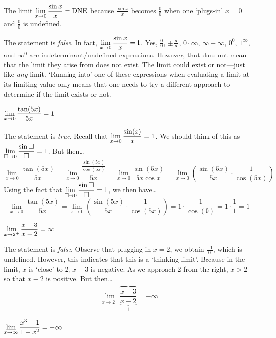 \documentclass[11pt,letterpaper]{article}
\begin{document}
 The limit $\displaystyle\lim_{x \to 0} \dfrac{\sin x}{x}= \text{DNE}$ because $\tfrac{\sin x}{x}$ becomes $\tfrac{0}{0}$ when one `plugs-in' $x= 0$ and $\frac{0}{0}$ is undefined. \pspace

\sol The statement is \textit{false}. In fact, $\displaystyle\lim_{x \to 0} \dfrac{\sin x}{x}= 1$. Yes, $\tfrac{0}{0}$, $\pm\tfrac{\infty}{\infty}$, $0 \cdot \infty$, $\infty - \infty$, $0^0$, $1^\infty$, and $\infty^0$ are indeterminant/undefined expressions. However, that does not mean that the limit they arise from does not exist. The limit could exist or not---just like \textit{any} limit. `Running into' one of these expressions when evaluating a limit at its limiting value only means that one needs to try a different approach to determine if the limit exists or not. \pvspace{1.3cm}



 $\displaystyle\lim_{x \to 0} \dfrac{\tan(5x)}{5x}= 1$ \pspace

\sol The statement is \textit{true}. Recall that $\displaystyle\lim_{x \to 0} \dfrac{\sin(x)}{x}= 1$. We should think of this as $\displaystyle\lim_{\Box \to 0} \dfrac{\sin \Box}{\Box}= 1$. But then\dots
	\[
	\lim_{x \to 0} \dfrac{\tan(5x)}{5x}= \lim_{x \to 0} \dfrac{\tfrac{\sin(5x)}{\cos(5x)}}{5x}= \lim_{x \to 0} \dfrac{\sin(5x)}{5x \cos x}= \lim_{x \to 0} \left( \dfrac{\sin(5x)}{5x} \cdot \dfrac{1}{\cos(5x)} \right)
	\]
Using the fact that $\displaystyle\lim_{\Box \to 0} \dfrac{\sin \Box}{\Box}= 1$, we then have\dots
	\[
	\lim_{x \to 0} \dfrac{\tan(5x)}{5x}= \lim_{x \to 0} \left( \dfrac{\sin(5x)}{5x} \cdot \dfrac{1}{\cos(5x)} \right)= 1 \cdot \dfrac{1}{\cos(0)}= 1 \cdot \dfrac{1}{1}= 1
	\] \pvspace{1.3cm}



 $\displaystyle\lim_{x \to 2^+} \dfrac{x - 3}{x - 2}= \infty$ \pspace

\sol The statement is \textit{false}. Observe that plugging-in $x= 2$, we obtain $\frac{-1}{0}$, which is undefined. However, this indicates that this is a `thinking limit'. Because in the limit, $x$ is `close' to 2, $x - 3$ is negative. As we approach 2 from the right, $x > 2$ so that $x - 2$ is positive. But then\dots
	\[
	\lim_{x \to 2^+} \dfrac{\overbrace{x - 3}^{-}}{\underbrace{x - 2}_{+}}= -\infty
	\] \pvspace{1.3cm}



 $\displaystyle\lim_{x \to \infty} \dfrac{x^3 - 1}{1 - x^2}= -\infty$ \pspace
\end{document}
